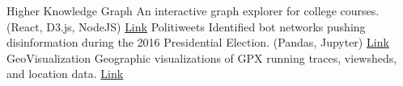 	\begin{projects}
		\project
			{Higher Knowledge Graph}
			{An interactive graph explorer for college courses. (React, D3.js, NodeJS)}
			{\href{https://github.com/ryan-p-larson/higher-knowledge-graph}{Link}}
		\project
			{Politiweets}
			{Identified bot networks pushing disinformation during the 2016 Presidential Election. (Pandas, Jupyter)}
			{\href{https://github.com/ryan-p-larson/polititweets}{Link}}
		\project
			{GeoVisualization}
			{Geographic visualizations of GPX running traces, viewsheds, and location data.}
			{\href{https://github.com/ryan-p-larson/city-maps}{Link}}
	\end{projects}



